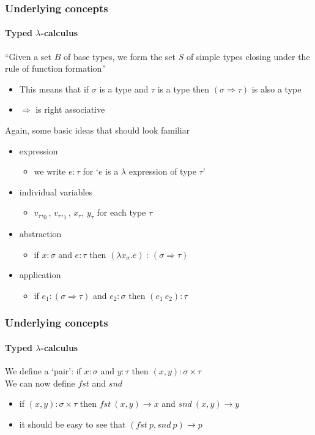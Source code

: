 \documentclass{beamer}
\begin{document}
\begin{frame}
  \frametitle{Underlying concepts}
  \framesubtitle{Typed $\lambda$-calculus}
  ``Given a set $B$ of base types, we form the set $S$ of simple types
  closing under the rule of function formation''
  \pause
  \begin{itemize}[<+->]
    \item This means that if $\sigma$ is a type and $\tau$ is a type
      then $(\sigma \Rightarrow \tau)$ is also a type
    \item $\Rightarrow$ is right associative
  \end{itemize}
  \pause
  Again, some basic ideas that should look familiar
  \pause
  \begin{itemize}[<+->]
    \item expression
      \begin{itemize}
        \item we write $e:\tau$ for `$e$ is a $\lambda$ expression of
          type $\tau$'
      \end{itemize}
    \item individual variables
      \begin{itemize}
        \item $v_\tau,_0$, $v_\tau,_1$, $x_\tau$, $y_\tau$ for each
          type $\tau$
      \end{itemize}
    \item abstraction
      \begin{itemize}
        \item if $x:\sigma$ and $e:\tau$ then $(\lambda x_\sigma
          .e)\::\:(\sigma \Rightarrow \tau)$
      \end{itemize}
    \item application
      \begin{itemize}
        \item if $e_1 : (\sigma \Rightarrow \tau)$ and $e_2:\sigma$
          then $(e_1\:e_2):\tau$
      \end{itemize}
  \end{itemize}
\end{frame}
\begin{frame}
  \frametitle{Underlying concepts}
  \framesubtitle{Typed $\lambda$-calculus}
  We define a `pair': if $x:\sigma$ and $y:\tau$ then $(x,y): \sigma
  \times \tau$\\
  \pause
  We can now define $fst$ and $snd$
  \pause
  \begin{itemize}
    \item if $(x,y):\sigma \times \tau$ then $fst\:(x,y)
      \rightarrow x$ and $snd\:(x,y) \rightarrow y$
    \item it should be easy to see that $(fst\:p, snd\:p) \rightarrow p$
  \end{itemize}
\end{frame}
\end{document}
